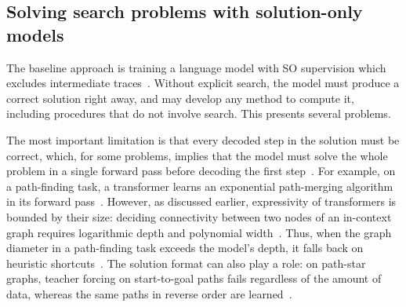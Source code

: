 \subsection{Solving search problems with solution-only models}
\label{sec:bg_search_lm_internal}

The baseline approach is training a language model with SO supervision which excludes intermediate traces~\citep{lehnertBetterPlanningTransformers2024,gandhiStreamSearchSoS2024}.
Without explicit search, the model must produce a correct solution right away, and may develop any method to compute it, including procedures that do not involve search.
This presents several problems.

The most important limitation is that every decoded step in the solution must be correct, which, for some problems, implies that the model must solve the whole problem in a single forward pass before decoding the first step~\citep{bachmannPitfallsNexttokenPrediction2025}.
For example, on a path-finding task, a transformer learns an exponential path-merging algorithm in its forward pass~\citep{saparovTransformersStruggleLearn2025}.
However, as discussed earlier, expressivity of transformers is bounded by their size: deciding connectivity between two nodes of an in-context graph requires logarithmic depth and polynomial width~\citep{sanfordUnderstandingTransformerReasoning2024,sanfordTransformersParallelComputation2024}.
Thus, when the graph diameter in a path-finding task exceeds the model's depth, it falls back on heuristic shortcuts~\citep{yeTransformersProvablyLearn2026}.
The solution format can also play a role: on path-star graphs, teacher forcing on start-to-goal paths fails regardless of the amount of data, whereas the same paths in reverse order are learned~\citep{bachmannPitfallsNexttokenPrediction2025}.

